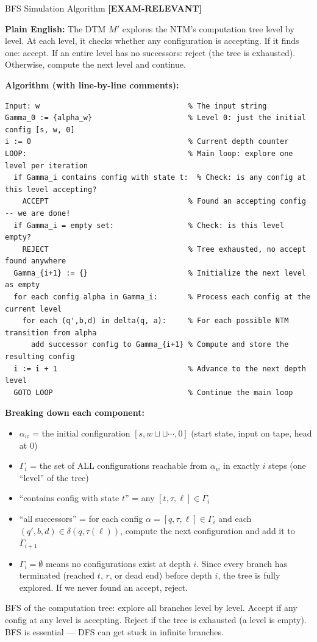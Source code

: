 \documentclass[11pt,a4paper]{article}
\newcommand{\kemark}{\textcolor{red!70!black}{\textbf{[EXAM-RELEVANT]}}}
\newcommand{\kt}[1]{\par\vspace{0.3em}\colorbox{yellow!60}{\parbox{\dimexpr\linewidth-2\fboxsep}{#1}}\vspace{0.3em}}
\begin{document}
\begin{definitionbox}{{BFS Simulation Algorithm} \kemark}

\textbf{Plain English:}
The DTM $M'$ explores the NTM's computation tree level by level. At each level, it checks whether any configuration is accepting. If it finds one: accept. If an entire level has no successors: reject (the tree is exhausted). Otherwise, compute the next level and continue.

\textbf{Algorithm (with line-by-line comments):}
\begin{lstlisting}
Input: w                                  % The input string
Gamma_0 := {alpha_w}                      % Level 0: just the initial config [s, w, 0]
i := 0                                    % Current depth counter
LOOP:                                     % Main loop: explore one level per iteration
  if Gamma_i contains config with state t:  % Check: is any config at this level accepting?
    ACCEPT                                % Found an accepting config -- we are done!
  if Gamma_i = empty set:                 % Check: is this level empty?
    REJECT                                % Tree exhausted, no accept found anywhere
  Gamma_{i+1} := {}                       % Initialize the next level as empty
  for each config alpha in Gamma_i:       % Process each config at the current level
    for each (q',b,d) in delta(q, a):     % For each possible NTM transition from alpha
      add successor config to Gamma_{i+1} % Compute and store the resulting config
  i := i + 1                              % Advance to the next depth level
  GOTO LOOP                               % Continue the main loop
\end{lstlisting}

\textbf{Breaking down each component:}
\begin{itemize}[nosep]
\item $\alpha_w$ = the initial configuration $[s, w\sqcup\sqcup\cdots, 0]$ (start state, input on tape, head at 0)
\item $\Gamma_i$ = the set of ALL configurations reachable from $\alpha_w$ in exactly $i$ steps (one ``level'' of the tree)
\item ``contains config with state $t$'' = any $[t, \tau, \ell] \in \Gamma_i$
\item ``all successors'' = for each config $\alpha = [q, \tau, \ell] \in \Gamma_i$ and each $(q', b, d) \in \delta(q, \tau(\ell))$, compute the next configuration and add it to $\Gamma_{i+1}$
\item $\Gamma_i = \emptyset$ means no configurations exist at depth $i$. Since every branch has terminated (reached $t$, $r$, or dead end) before depth $i$, the tree is fully explored. If we never found an accept, reject.
\end{itemize}

\kt{BFS of the computation tree: explore all branches level by level. Accept if any config at any level is accepting. Reject if the tree is exhausted (a level is empty). BFS is essential --- DFS can get stuck in infinite branches.}
\end{definitionbox}
\end{document}

